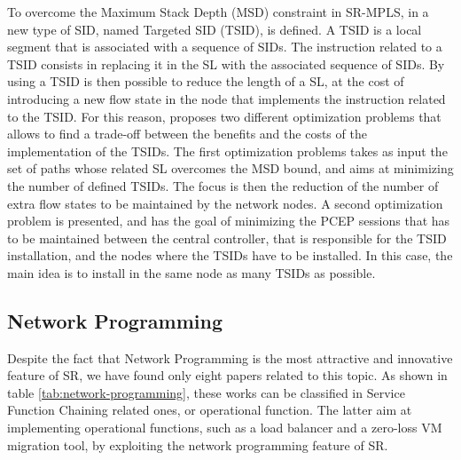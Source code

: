 To overcome the Maximum Stack Depth (MSD) constraint in SR-MPLS, in \cite{guedrez2017new} a new type of SID, named Targeted SID (TSID), is defined.
A TSID is a local segment that is associated with a sequence of SIDs. 
The instruction related to a TSID consists in replacing it in the SL with the associated sequence of SIDs.
By using a TSID is then possible to reduce the length of a SL, at the cost of introducing a new flow state in the node that implements the instruction related to the TSID.
For this reason, \cite{guedrez2017new} proposes two different optimization problems that allows to find a trade-off between the benefits and the costs of the implementation of the TSIDs.
The first optimization problems takes as input the set of paths whose related SL overcomes the MSD bound, and aims at minimizing the number of defined TSIDs. 
The focus is then the reduction of the number of extra flow states to be maintained by the network nodes.
A second optimization problem is presented, and has the goal of minimizing the PCEP sessions that has to be maintained between the central controller, that is responsible for the TSID installation, and the nodes where the TSIDs have to be installed.
In this case, the main idea is to install in the same node as many TSIDs as possible.

\subsection{Network Programming}
\label{sec:netprog}

Despite the fact that Network Programming is the most attractive and innovative feature of SR, we have found only eight papers related to this topic.
As shown in table \ref{tab:network-programming}, these works can be classified in Service Function Chaining related ones, or operational function.
The latter aim at implementing operational functions, such as a load balancer and a zero-loss VM migration tool, by exploiting the network programming feature of SR.

